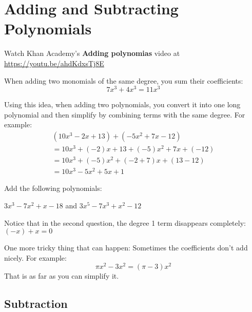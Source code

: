 \chapter{Adding and Subtracting Polynomials}

Watch Khan Academy's \textbf{Adding polynomias} video at \url{https://youtu.be/ahdKdxsTj8E}

When adding two monomials of the same degree, you sum their coefficients:
\begin{equation*}
  7x^3 + 4x^3 = 11x^3
\end{equation*}

Using this idea, when adding two polynomials, you convert it into one long
polynomial and then simplify by combining terms with the same degree. For example:
\begin{multline*}
  (10x^3 - 2x + 13) + (-5x^2 + 7x -12) \\
  = 10x^3 + (-2)x + 13 + (-5)x^2 + 7x + (-12) \\
  = 10x^3 + (-5)x^2 + (-2 + 7)x + (13 - 12) \\
  = 10x^3 - 5x^2 + 5x + 1
\end{multline*}

\begin{Exercise}[title=Adding Polynomials Practice, label=addpns]
  Add the following polynomials:
  \vspace{20mm}
  \vspace{20mm}
\end{Exercise}
\begin{Answer}[ref=addpns]$3x^3 - 7x^2 + x - 18$ and $3x^5 - 7x^3 + x^2 - 12$\end{Answer}

Notice that in the second question, the degree 1 term disappears completely: $(-x) + x = 0$

One more tricky thing that can happen: Sometimes the coefficients don't add nicely.  For example:
\begin{equation*}
  \pi x^2 - 3 x^2 = (\pi - 3) x^2
\end{equation*}
That is as far as you can simplify it.
    
\section{Subtraction}

